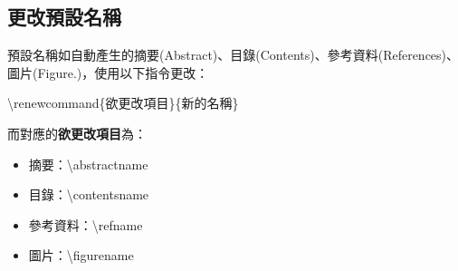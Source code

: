 \documentclass[12pt]{article}
\begin{document}
\begin{CJK*}{UTF8}{bsmi}
			\subsection{更改預設名稱}
				預設名稱如自動產生的摘要(Abstract)、目錄(Contents)、參考資料(References)、圖片(Figure.)，使用以下指令更改：
				\begin{center}
					\textbackslash renewcommand\{欲更改項目\}\{新的名稱\}
				\end{center}
				而對應的\textbf{欲更改項目}為：
				\begin{itemize}
					\item 摘要：\textbackslash abstractname
					\item 目錄：\textbackslash contentsname
					\item 參考資料：\textbackslash refname
					\item 圖片：\textbackslash figurename
				\end{itemize}
			
	\end{CJK*}
\end{document}
